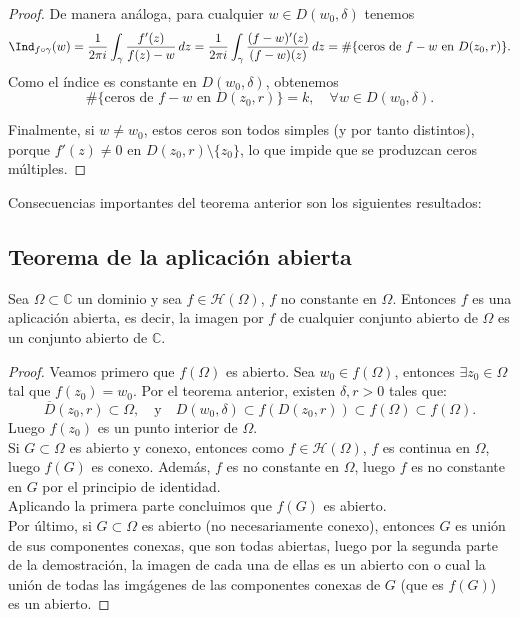 \begin{proof}
    De manera análoga, para cualquier $w \in D(w_0, \delta)$ tenemos
    \[
        \Ind_{f \circ \gamma}(w)
        = \frac{1}{2\pi i} \int_\gamma \frac{f'(z)}{f(z) - w} \, dz
        = \frac{1}{2\pi i} \int_\gamma \frac{(f - w)'(z)}{(f - w)(z)} \, dz
        = \# \{ \text{ceros de } f - w \text{ en } D(z_0, r) \}.
    \]
    Como el índice es constante en $D(w_0, \delta)$, obtenemos
    \[
        \# \{ \text{ceros de } f - w \text{ en } D(z_0, r) \} = k, \quad \forall w \in D(w_0, \delta).
    \]

    Finalmente, si $w \neq w_0$, estos ceros son todos simples (y por tanto distintos), porque $f'(z) \neq 0$ en $D(z_0, r) \setminus \{z_0\}$, lo que impide que se produzcan ceros múltiples.
\end{proof}

Consecuencias importantes del teorema anterior son los siguientes resultados:

\subsection{Teorema de la aplicación abierta}

\begin{teorema} 
    Sea $\Omega \subset \mathbb{C}$ un dominio y sea $f \in \mathcal{H}(\Omega)$, $f$ no constante en $\Omega$. Entonces $f$ es una aplicación abierta, es decir, la imagen por $f$ de cualquier conjunto abierto de $\Omega$ es un conjunto abierto de $\mathbb{C}$.
\end{teorema}

\begin{proof}
    Veamos primero que $f(\Omega)$ es abierto. Sea $w_0 \in f(\Omega)$, entonces $\exists z_0 \in \Omega$ tal que $f(z_0) = w_0$. Por el teorema anterior, existen $\delta, r > 0$ tales que:
    \[
        \overline{D}(z_0,r) \subset \Omega, \quad \text{y} \quad D(w_0, \delta) \subset f(D(z_0,r)) \subset f(\Omega) \subset f(\Omega).
    \]
    Luego $f(z_0)$ es un punto interior de $\Omega$.\\
    Si $G \subset \Omega$ es abierto y conexo, entonces como $f \in \mathcal{H}(\Omega)$, $f$ es continua en $\Omega$, luego $f(G)$ es conexo. Además, $f$ es no constante en $\Omega$, luego $f$ es no constante en $G$ por el principio de identidad.\\
    Aplicando la primera parte concluimos que $f(G)$ es abierto.\\
    Por último, si $G \subset \Omega$ es abierto (no necesariamente conexo), entonces $G$ es unión de sus componentes conexas, que son todas abiertas, luego por la segunda parte de la demostración, la imagen de cada una de ellas es un abierto con o cual la unión de todas las imgágenes de las componentes conexas de $G$ (que es $f(G)$) es un abierto.
\end{proof}

